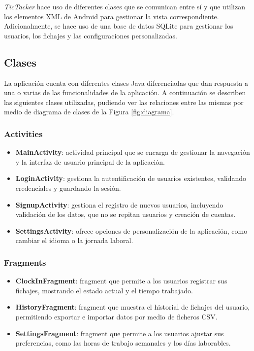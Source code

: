 \textit{TicTacker} hace uso de diferentes clases que se comunican entre sí y que utilizan los elementos XML de Android para gestionar la vista correspondiente. Adicionalmente, se hace uso de una base de datos SQLite para gestionar los usuarios, los fichajes y las configuraciones personalizadas.

\subsection{Clases}
La aplicación cuenta con diferentes clases Java diferenciadas que dan respuesta a una o varias de las funcionalidades de la aplicación. A continuación se describen las siguientes clases utilizadas, pudiendo ver las relaciones entre las mismas por medio de diagrama de clases de la Figura \ref{fig:diagrama}.

\subsubsection{Activities}
\begin{itemize}
  \item \textbf{MainActivity}: actividad principal que se encarga de gestionar la navegación y la interfaz de usuario principal de la aplicación.
  \item \textbf{LoginActivity}: gestiona la autentificación de usuarios existentes, validando credenciales y guardando la sesión.
  \item \textbf{SignupActivity}: gestiona el registro de nuevos usuarios, incluyendo validación de los datos, que no se repitan usuarios y creación de cuentas.
  \item \textbf{SettingsActivity}: ofrece opciones de personalización de la aplicación, como cambiar el idioma o la jornada laboral.
\end{itemize}

\subsubsection{Fragments}
\begin{itemize}
  \item \textbf{ClockInFragment}: fragment que permite a los usuarios registrar sus fichajes, mostrando el estado actual y el tiempo trabajado.
  \item \textbf{HistoryFragment}: fragment que muestra el historial de fichajes del usuario, permitiendo exportar e importar datos por medio de ficheros CSV.
  \item \textbf{SettingsFragment}: fragment que permite a los usuarios ajustar sus preferencias, como las horas de trabajo semanales y los días laborables.
\end{itemize}

